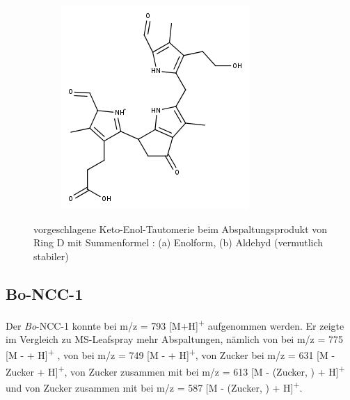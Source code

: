 \begin{figure}[!htbp]
\begin{subfigure}[b]{0.5\textwidth}
    \includegraphics[width=\textwidth]{figures/Kapitel7/Kataboliten/fragmentation_structures/VWA_Katabolit_647-CO2-RingD_480_MH_Ketoform.png}
    \caption{}
    \label{fig:480Keto}
  \end{subfigure}
  \caption[Vorschlag für die Keto-Enol-Tautomerie der Ring D Abspaltung von \textit{Bo}-NCC-3, Quelle: Autor]{vorgeschlagene Keto-Enol-Tautomerie beim Abspaltungsprodukt von Ring D mit Summenformel : (a) Enolform, (b) Aldehyd (vermutlich stabiler)}
\end{figure}

\pagebreak
\subsection{Bo-NCC-1} \label{sec:ESIMSBoNCC1}

Der \textit{Bo}-NCC-1 konnte bei m/z = 793 [M+H]\textsuperscript{+} aufgenommen werden. Er zeigte im Vergleich zu MS-Leafspray mehr Abspaltungen, nämlich von  bei m/z = 775 [M -  + H]\textsuperscript{+} , von  bei m/z = 749 [M -  + H]\textsuperscript{+}, von Zucker bei m/z = 631 [M - Zucker + H]\textsuperscript{+}, von Zucker zusammen mit  bei m/z = 613 [M - (Zucker, ) + H]\textsuperscript{+} und von Zucker zusammen mit  bei m/z = 587 [M - (Zucker, ) + H]\textsuperscript{+}. 

